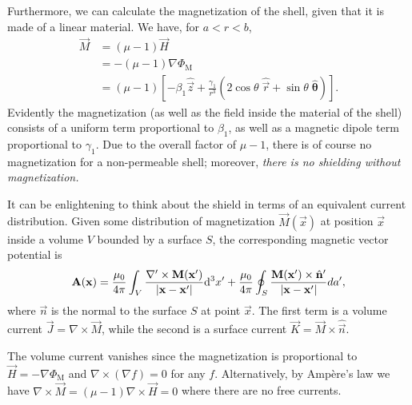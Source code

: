 Furthermore, we can calculate the magnetization of the shell, given that it is
made of a linear material. We have, for $a<r<b$,
%
\begin{align}
   \label{magnetization_in_sphere}
   \vec M&=(\mu-1)\vec H\nonumber\\
   &=-(\mu-1)\nabla\Phi_\text{M}\nonumber\\
   &=(\mu-1)\left[-\beta_1\hat{\vec
   z}+\frac{\gamma_1}{r^3}\left(2\cos\theta\;\hat{\vec
   r}+\sin\theta\;\hat{\boldsymbol\theta}\right)\right].
\end{align}
%
Evidently the magnetization (as well as the field inside the material of the
shell) consists of a uniform term proportional to $\beta_1$, as well as a
magnetic dipole term proportional to $\gamma_1$. Due to the overall factor of
$\mu-1$, there is of course no magnetization for a non-permeable shell;
moreover, \emph{there is no shielding without magnetization.}

It can be enlightening to think about the shield in terms of an equivalent
current distribution. Given some distribution of magnetization $\vec M(\vec x)$
at position $\vec x$ inside a volume $V$ bounded by a surface $S$, the
corresponding magnetic vector potential is
\cite[eqn~5.103]{jackson1998classical}
%
\begin{equation}
   \label{potential_vs_magnetization}
   \mathbf{A}(\mathbf{x})=
   \frac{\mu_0}{4\pi}
   \int_V\frac{\nabla'\times\mathbf{M}(\mathbf{x}')}{|\mathbf{x}-\mathbf{x}'|}\mathrm{d}^3x'
   +
   \frac{\mu_0}{4\pi}
   \oint_S\frac{\mathbf{M}(\mathbf{x}')\times\hat{\mathbf{n}}'}{|\mathbf{x}-\mathbf{x}'|}da',
\end{equation}
%
where $\vec n$ is the normal to the surface $S$ at point $\vec x$. The first
term is a volume current $\vec J=\nabla\times\vec M$, while the second is a
surface current $\vec K=\vec M\times\hat{\vec n}$.

The volume current vanishes since the magnetization is proportional to $\vec
H=-\nabla\Phi_\text{M}$ and $\nabla\times(\nabla f)=0$ for any $f$.
Alternatively, by Amp\`ere's law we have $\nabla\times\vec
M=(\mu-1)\nabla\times\vec H=0$ where there are no free currents.

